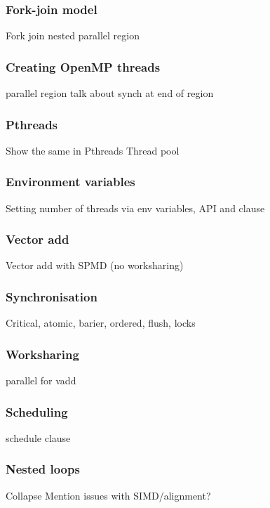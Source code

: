 \documentclass{beamer}
\begin{document}
\begin{frame}
\frametitle{Fork-join model}
Fork join
nested parallel region
\end{frame}

\begin{frame}
\frametitle{Creating OpenMP threads}
parallel region
talk about synch at end of region
\end{frame}

\begin{frame}
\frametitle{Pthreads}
Show the same in Pthreads
Thread pool
\end{frame}


\begin{frame}
\frametitle{Environment variables}
Setting number of threads via env variables, API and clause
\end{frame}

\begin{frame}
\frametitle{Vector add}
Vector add with SPMD (no worksharing)
\end{frame}

\begin{frame}
\frametitle{Synchronisation}
Critical, atomic, barier, ordered, flush, locks
\end{frame}

\begin{frame}
\frametitle{Worksharing}
parallel for vadd

\end{frame}

\begin{frame}
\frametitle{Scheduling}
schedule clause

\end{frame}

\begin{frame}
\frametitle{Nested loops}
Collapse
Mention issues with SIMD/alignment?

\end{frame}
\end{document}
